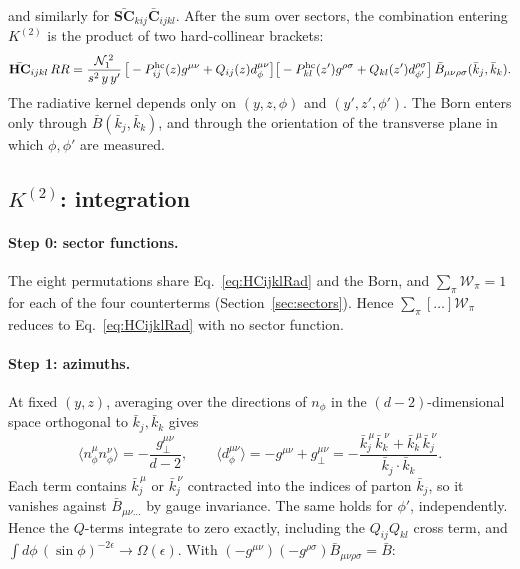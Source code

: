 \documentclass[11pt,a4paper]{article}
\newcommand{\bbC}[1]{\bar{\mathbf C}_{#1}}
\newcommand{\bbSC}[1]{\bar{\mathbf{SC}}_{#1}}
\newcommand{\bbHC}[1]{\bar{\mathbf{HC}}_{#1}}
\newcommand{\RR}{RR}
\newcommand{\W}[1]{\mathcal W_{#1}}
\newcommand{\jb}{\bar k_{j}}
\newcommand{\kb}{\bar k_{k}}
\newcommand{\eps}{\epsilon}
\newcommand{\Norms}{\mathcal N_1^{\,2}}
\begin{document}
and similarly for $\bbSC{kij}\bbC{ijkl}$. After the sum over sectors, the combination entering $K^{(2)}$ is the product of two hard-collinear brackets:
\begin{equation}
\bbHC{ijkl}\,\RR=\frac{\Norms}{s^2\,y\,y'}\,
\big[-P^{\rm hc}_{ij}(z)g^{\mu\nu}+Q_{ij}(z)d^{\mu\nu}_\phi\big]
\big[-P^{\rm hc}_{kl}(z')g^{\rho\sigma}+Q_{kl}(z')d^{\rho\sigma}_{\phi'}\big]\,
\bar B_{\mu\nu\rho\sigma}(\jb,\kb).
\label{eq:HCijklRad}
\end{equation}
The radiative kernel depends only on $(y,z,\phi)$ and $(y',z',\phi')$. The Born enters only through
$\bar B(\jb,\kb)$, and through the orientation of the transverse plane in which $\phi,\phi'$ are measured.

\subsection{$K^{(2)}$: integration}
\label{sec:intK2}

\paragraph{Step 0: sector functions.} The eight permutations share Eq.~\eqref{eq:HCijklRad} and the Born, and
$\sum_\pi\W{\pi}=1$ for each of the four counterterms (Section~\ref{sec:sectors}). Hence
$\sum_\pi[\dots]\W{\pi}$ reduces to Eq.~\eqref{eq:HCijklRad} with no sector function.

\paragraph{Step 1: azimuths.} At fixed $(y,z)$, averaging over the directions of $n_\phi$ in the $(d-2)$-dimensional space orthogonal to $\jb,\kb$ gives
\begin{equation}
\langle n_\phi^\mu n_\phi^\nu\rangle=-\frac{g_\perp^{\mu\nu}}{d-2},\qquad
\langle d^{\mu\nu}_\phi\rangle=-g^{\mu\nu}+g^{\mu\nu}_\perp=-\frac{\jb^{\,\mu}\kb^{\,\nu}+\kb^{\,\mu}\jb^{\,\nu}}{\jb\cdot\kb}.
\end{equation}
Each term contains $\jb^{\,\mu}$ or $\jb^{\,\nu}$ contracted into the indices of parton $\jb$, so it vanishes against $\bar B_{\mu\nu\dots}$ by gauge invariance.
The same holds for $\phi'$, independently. Hence the $Q$-terms integrate to zero exactly, including the $Q_{ij}Q_{kl}$ cross term, and
$\int d\phi\,(\sin\phi)^{-2\eps}\to\Omega(\eps)$. With $(-g^{\mu\nu})(-g^{\rho\sigma})\bar B_{\mu\nu\rho\sigma}=\bar B$:
\end{document}
